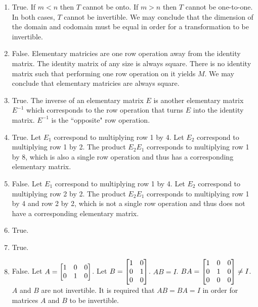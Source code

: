 \begin{exercises}
\begin{problist}
		\begin{solution}
			\begin{enumerate}
				\item True. If $m<n$ then $T$ cannot be onto. If $m>n$ then $T$ cannot
					be one-to-one. In both cases, $T$ cannot be invertible. We may conclude
					that the dimension of the domain and codomain must be equal in order
					for a transformation to be invertible.

				\item False. Elementary matricies are one row operation away from the identity
					matrix. The identity matrix of any size is always square. There is no
					identity matrix such that performing one row operation on it yields $M$.
					We may conclude that elementary matricies are always square.

				\item True. The inverse of an elementary matrix $E$ is another elementary
					matrix $E^{-1}$ which corresponds to the row operation that turns $E$
					into the identity matrix. $E^{-1}$ is the ``opposite" row operation.

				\item True. Let $E_{1}$ correspond to multiplying row 1 by 4. Let $E_{2}$
					correspond to multiplying row 1 by 2. The product $E_{2}E_{1}$ corresponds
					to multiplying row 1 by 8, which is also a single row operation and
					thus has a corresponding elementary matrix.

				\item False. Let $E_{1}$ correspond to multiplying row 1 by 4. Let $E
					_{2}$ correspond to multiplying row 2 by 2. The product $E_{2}E_{1}$
					corresponds to multiplying row 1 by 4 and row 2 by 2, which is not a
					single row operation and thus does not have a corresponding
					elementary matrix.

				\item True.

				\item True.

				\item False. Let $A = \mat{1&0&0\\0&1&0}$. Let $B = \mat{1&0\\0&1\\0&0}$.
					$AB = I$. $BA = \mat{1&0&0\\0&1&0\\0&0&0}\neq I$. $A$ and $B$ are not
					invertible. It is required that $AB = BA = I$ in order for matrices
					$A$ and $B$ to be invertible.
			\end{enumerate}
		\end{solution}
	\end{problist}
\end{exercises}
